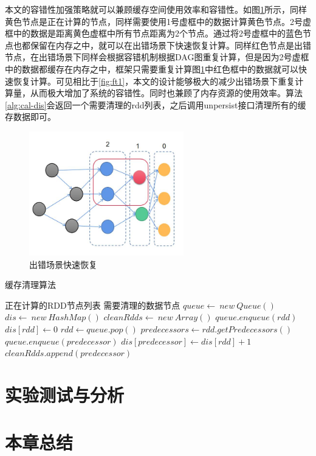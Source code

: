 本文的容错性加强策略就可以兼顾缓存空间使用效率和容错性。如图\ref{fig:ft2}所示，同样黄色节点是正在计算的节点，同样需要使用1号虚框中的数据计算黄色节点。2号虚框中的数据是距离黄色虚框中所有节点距离为2个节点。通过将2号虚框中的蓝色节点也都保留在内存之中，就可以在出错场景下快速恢复计算。同样红色节点是出错节点，在出错场景下同样会根据容错机制根据DAG图重复计算，但是因为2号虚框中的数据都缓存在内存之中，框架只需要重复计算图\ref{fig:ft2}中红色框中的数据就可以快速恢复计算。可见相比于\ref{fig:ft1}，本文的设计能够极大的减少出错场景下重复计算量，从而极大增加了系统的容错性。同时也兼顾了内存资源的使用效率。算法\ref{alg:cal-dis}会返回一个需要清理的rdd列表，之后调用unpersist接口清理所有的缓存数据即可。

\begin{figure}[htbp]
    \centering
    \includegraphics[width=0.6\textwidth]{Img/ft2.png}
    \caption{出错场景快速恢复}
    \label{fig:ft2}
\end{figure}

\begin{algorithm}  
    \caption{缓存清理算法}  
    \begin{algorithmic}[1] %
        \Require 正在计算的RDD节点列表
        \Ensure 需要清理的数据节点
            \State $queue \gets \ new \ Queue()$
            \State $dis \gets  \ new \ HashMap()$
            \State $cleanRdds \gets \ new \ Array()$
                \State $queue.enqueue(rdd)$
                \State $dis[rdd] \gets 0$
            \EndFor
                \State $rdd \gets queue.pop()$
                \State $predecessors \gets rdd.getPredecessors()$
                    \State $queue.enqueue(predecessor)$
                    \State $dis[predecessor] \gets dis[rdd]+1$
                        $cleanRdds.append(predecessor)$
                    \EndIf
                \EndFor
            \EndWhile
        \EndFunction
    \end{algorithmic}
    \label{alg:cal-dis}
\end{algorithm}

\section{实验测试与分析}
\section{本章总结}
